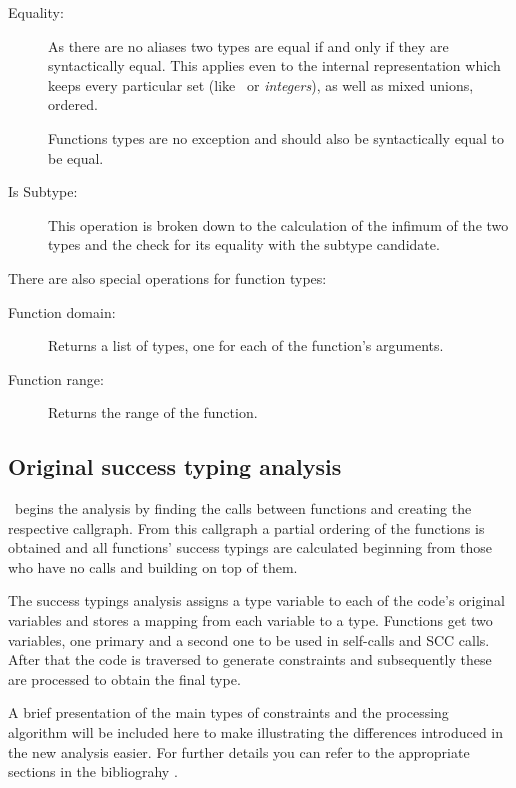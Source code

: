 \begin{description}
\item[Equality:] As there are no aliases two types are equal if and
  only if they are syntactically equal. This applies even to the
  internal representation which keeps every particular set (like
  \atoms\ or \emph{integers}), as well as mixed unions, ordered.

  Functions types are no exception and should also be syntactically
  equal to be equal.

\item[Is Subtype:] This operation is broken down to the calculation of
  the infimum of the two types and the check for its equality with the
  subtype candidate.
\end{description}

There are also special operations for function types:

\begin{description}
\item[Function domain:] Returns a list of types, one for each of the
  function's arguments.
\item[Function range:] Returns the range of the function.
\end{description}

\subsection{Original success typing analysis}
\label{sct:orig_analysis}

\dr\ begins the analysis by finding the calls between functions and
creating the respective callgraph. From this callgraph a partial
ordering of the functions is obtained and all functions' success
typings are calculated beginning from those who have no calls and
building on top of them.

The success typings analysis assigns a type variable to each of the
code's original variables and stores a mapping from each variable to a
type. Functions get two variables, one primary and a second one to be
used in self-calls and SCC calls. After that the code is traversed to
generate constraints and subsequently these are processed to obtain
the final type.

A brief presentation of the main types of constraints and the
processing algorithm will be included here to make illustrating the
differences introduced in the new analysis easier. For further details
you can refer to the appropriate sections in the bibliograhy
\cite{Elli, SuccessTypings@PPDP-06}.

